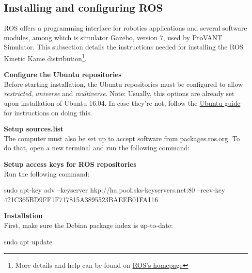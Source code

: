 \subsection{Installing and configuring ROS}

ROS offers a programming interface for robotics applications and several software modules, among which is simulator Gazebo, version 7, used by ProVANT Simulator. This subsection details the instructions needed for installing the ROS Kinetic Kame distribution\footnote{More details and help can be found on \href{wiki.ros.org}{ROS's homepage}}.\\
\bigskip
\bigskip
\bigskip

\textbf{Configure the Ubuntu repositories}\\

Before starting installation, the Ubuntu repositories must be configured to allow \textit{restricted}, \textit{universe} and \textit{multiverse}. Note: Usually, this options are already set upon installation of Ubuntu 16.04. In case they're not, follow the \href{https://help.ubuntu.com/community/Repositories/Ubuntu}{Ubuntu guide} for instructions on doing this.

\textbf{Setup sources.list}\\

The computer must also be set up to accept software from packages.ros.org. To do that, open a new terminal and run the following command:


\textbf{Setup access keys for ROS repositories}\\

Run the following command:

\begin{bashcode}
sudo apt-key adv --keyserver hkp://ha.pool.sks-keyservers.net:80 --recv-key 
421C365BD9FF1F717815A3895523BAEEB01FA116
\end{bashcode}

\textbf{Installation}\\

First, make sure the Debian package index is up-to-date:

\begin{bashcode}
sudo apt update
\end{bashcode}

